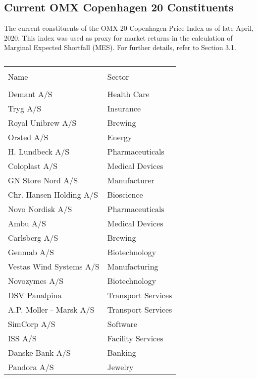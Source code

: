 \documentclass[10pt]{article} %
\begin{document}
\subsection{Current OMX Copenhagen 20 Constituents}
The current constituents of the OMX 20 Copenhagen Price Index as of late April, 2020. This index was used as proxy for market returns in the calculation of Marginal Expected Shortfall (MES). For further details, refer to Section 3.1.
\begin{table}[H]
    \centering
    \caption{}
    \small{
    \begin{tabular}{l l} \hline \\
         Name & Sector \\ \hline \\
         Demant A/S & Health Care \\
         Tryg A/S & Insurance \\
         Royal Unibrew A/S & Brewing \\
         Orsted A/S & Energy \\
         H. Lundbeck A/S & Pharmaceuticals \\
         Coloplast A/S & Medical Devices \\
         GN Store Nord A/S & Manufacturer \\
         Chr. Hansen Holding A/S & Bioscience \\
         Novo Nordisk A/S & Pharmaceuticals \\
         Ambu A/S & Medical Devices \\
         Carlsberg A/S & Brewing \\
         Genmab A/S & Biotechnology \\
         Vestas Wind Systems A/S & Manufacturing \\
         Novozymes A/S & Biotechnology \\
         DSV Panalpina & Transport Services \\
         A.P. Moller - Marsk A/S & Transport Services \\
         SimCorp A/S & Software \\
         ISS A/S & Facility Services \\
         Danske Bank A/S & Banking \\
         Pandora A/S & Jewelry \\
    \end{tabular}}
    \label{}
\end{table}

\end{document}

